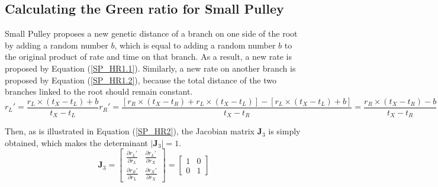 \documentclass{bmcart}
\begin{document}
\begin{backmatter}
\subsection*{Calculating the Green ratio for Small Pulley}
Small Pulley proposes a new genetic distance of a branch on one side of the root by adding a random number $b$, which is equal to adding a random number $b$ to the original product of rate and time on that branch. As a result, a new rate is proposed by Equation (\ref{SP_HR1.1}). Similarly, a new rate on another branch is proposed by Equation (\ref{SP_HR1.2}), because the total distance of the two branches linked to the root should remain constant.
\begin{subequations}\label{SP_HR1}
\begin{equation}\label{SP_HR1.1}
{r_L}' = \frac{{{r_L} \times ({t_X} - {t_L}) + b}}{{{t_X} - {t_L}}}
\end{equation}
\begin{equation}\label{SP_HR1.2}
{r_R}' = \frac{{[{r_R} \times ({t_X} - {t_R}) + {r_L} \times ({t_X} - {t_L})] - [{r_L} \times ({t_X} - {t_L}) + b]}}{{{t_X} - {t_R}}} = \frac{{{r_R} \times ({t_X} - {t_R}) - b}}{{{t_X} - {t_R}}}
\end{equation}
\end{subequations}

Then, as is illustrated in Equation (\ref{SP_HR2}), the Jacobian matrix ${{\mathbf{J}}_3}$ is simply obtained, which makes the determinant $\left| {{{\mathbf{J}}_3}} \right| = 1$.
\begin{equation}\label{SP_HR2}
{{\mathbf{J}}_3} = \left[ {\begin{array}{*{20}{c}}
  {\frac{{\partial {r_L}'}}{{\partial {r_L}}}}&{\frac{{\partial {r_L}'}}{{\partial {r_X}}}} \\
  {\frac{{\partial {r_R}'}}{{\partial {r_L}}}}&{\frac{{\partial {r_X}'}}{{\partial {r_X}}}}
\end{array}} \right] = \left[ {\begin{array}{*{20}{c}}
  1&0 \\
  0&1
\end{array}} \right]
\end{equation}

\end{backmatter}
\end{document}
